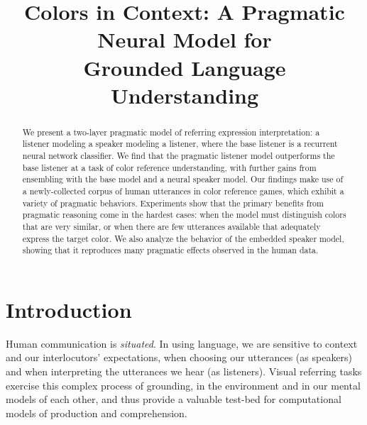 \documentclass[11pt,letterpaper]{article}
\title{Colors in Context: A Pragmatic Neural Model for \\
Grounded Language Understanding}
\author{}
\date{}
\renewcommand{\|}{\mid}
\begin{document}
\maketitle
\begin{abstract}


We present a two-layer pragmatic model of referring expression interpretation:
a listener modeling a speaker modeling a listener, where the base listener is a
recurrent neural network classifier. We find that the pragmatic listener
model outperforms the base listener at a task of color reference understanding,
with further gains from ensembling with the base model and a neural speaker model.
Our findings make use of a newly-collected corpus of human utterances in
color reference games, which exhibit a variety of pragmatic behaviors.
Experiments show that the primary benefits from pragmatic reasoning come
in the hardest cases: when the model must distinguish colors that are very
similar, or when there are few utterances available that adequately express
the target color. We also analyze the behavior of the embedded speaker model,
showing that it reproduces many pragmatic effects observed in the human data.

\end{abstract}

\section{Introduction} \label{sec:intro}


Human communication is \emph{situated}. In using language, we are sensitive
to context and our interlocutors' expectations, when choosing our
utterances (as speakers) and when interpreting the utterances we hear (as listeners).
Visual referring tasks exercise this complex process of grounding, 
in the environment and in
our mental models of each other, and thus provide a valuable test-bed for
computational models of production and comprehension.
\end{document}
